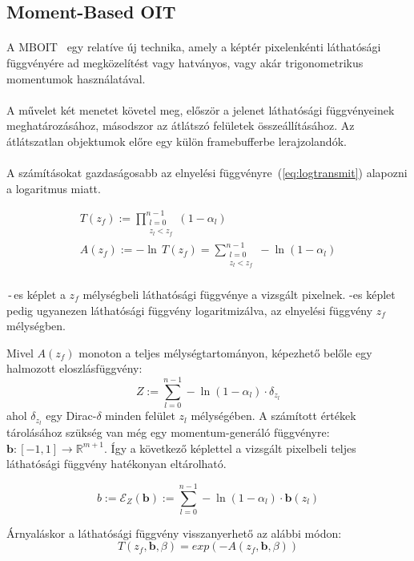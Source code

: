 \subsection{Moment-Based OIT}
\label{sec:MBOIT}
\paragraph{}A \ac{MBOIT}~\cite{10.1145/3203206} egy relatíve új technika, amely a képtér pixelenkénti láthatósági függvényére ad megközelítést vagy hatványos, vagy akár trigonometrikus momentumok használatával.

\paragraph{}A művelet két menetet követel meg, először a jelenet láthatósági függvényeinek meghatározásához, másodszor az átlátszó felületek összeállításához. Az átlátszatlan objektumok előre egy külön framebufferbe lerajzolandók.

\paragraph{}A számításokat gazdaságosabb az elnyelési függvényre~(\autoref{eq:logtransmit}) alapozni a logaritmus miatt.

\begin{gather}
	\label{eq:pointtransmittance} T(z_f) := \prod_{\substack{l=0\\z_l<z_f}}^{n-1}(1-\alpha_l)\\
	\label{eq:logtransmit}A(z_f) := -\ln\,T(z_f) = \sum_{\substack{l=0\\z_l<z_f}}^{n-1}-\ln(1-\alpha_l)
\end{gather}

\paragraph{}\,-\,es képlet a $z_f$ mélységbeli láthatósági függvénye a vizsgált pixelnek.
 -es képlet pedig ugyanezen láthatósági függvény logaritmizálva, az elnyelési függvény $z_f$ mélységben.

Mivel $A(z_f)$ monoton a teljes mélységtartományon, képezhető belőle egy halmozott eloszlásfüggvény:
$$Z := \sum_{l=0}^{n-1}-\ln(1-\alpha_l)\cdot\delta_{z_l}$$
ahol $\delta_{z_l}$ egy Dirac-$\delta$ minden felület $z_l$ mélységében. A számított értékek tárolásához szükség van még egy momentum-generáló függvényre: $\boldsymbol{b} : [-1,1] \rightarrow \mathbb{R}^{m+1}$. Így a következő képlettel a vizsgált pixelbeli teljes láthatósági függvény hatékonyan eltárolható.

$$b:=\mathcal{E}_Z(\boldsymbol{b}):=\sum_{l=0}^{n-1}-\ln(1-\alpha_l)\cdot\boldsymbol{b}(z_l)$$

Árnyaláskor a láthatósági függvény visszanyerhető az alábbi módon:
$$T(z_f,\boldsymbol{b},\beta) = exp(-A(z_f,\boldsymbol{b},\beta))$$